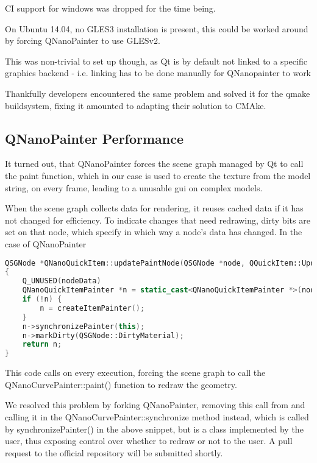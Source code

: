 CI support for windows was dropped for the time being.

On Ubuntu 14.04, no GLES3 installation is present, this could be worked around by forcing QNanoPainter to use GLESv2.

This was non-trivial to set up though, as Qt is by default not linked to a specific graphics backend - i.e. linking has to be done manually for QNanopainter to work

Thankfully developers encountered the same problem and solved it for the qmake buildsystem, fixing it amounted to adapting their solution to CMAke.

\subsection{QNanoPainter Performance}
It turned out, that QNanoPainter forces the scene graph managed by Qt to call the paint function, which in our case is used to create the texture from the model string, on every frame, leading to a unusable \gls{gui} on complex models.

When the scene graph collects data for rendering, it reuses cached data if it has not changed for efficiency. To indicate changes that need redrawing, dirty bits are set on that node, which specify in which way a node's data has changed. In the case of QNanoPainter 

\begin{lstlisting}[language=c++,caption=QNanoQuickItem as of commit de45f31e]
QSGNode *QNanoQuickItem::updatePaintNode(QSGNode *node, QQuickItem::UpdatePaintNodeData *nodeData)
{
    Q_UNUSED(nodeData)
    QNanoQuickItemPainter *n = static_cast<QNanoQuickItemPainter *>(node);
    if (!n) {
        n = createItemPainter();
    }
    n->synchronizePainter(this);
    n->markDirty(QSGNode::DirtyMaterial);
    return n;
}
\end{lstlisting}
This code calls  on every execution, forcing the scene graph to call the QNanoCurvePainter::paint() function to redraw the geometry.

We resolved this problem by forking QNanoPainter, removing this call from  and calling it in the QNanoCurvePainter::synchronize method instead, which is called by synchronizePainter() in the above snippet, but is a class implemented by the user, thus exposing control over whether to redraw or not to the user. A pull request to the official repository will be submitted shortly.

